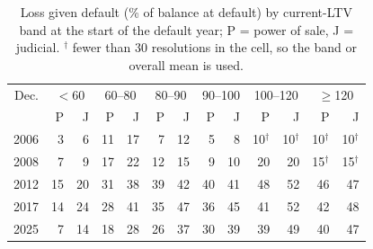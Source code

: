 \begin{table}[H]\centering\footnotesize
\caption{Loss given default (\% of balance at default) by current-LTV band at the start of the default year; P = power of sale, J = judicial. $^\dagger$ fewer than 30 resolutions in the cell, so the band or overall mean is used.}\label{tab:lgd}
\setlength{\tabcolsep}{3.5pt}
\begin{tabular}{rrrrrrrrrrrrr}\toprule
Dec. & \multicolumn{2}{c}{$<$60} & \multicolumn{2}{c}{60--80} & \multicolumn{2}{c}{80--90} & \multicolumn{2}{c}{90--100} & \multicolumn{2}{c}{100--120} & \multicolumn{2}{c}{$\ge$120} \\
 & P & J & P & J & P & J & P & J & P & J & P & J \\ \midrule
2006 & 3 & 6 & 11 & 17 & 7 & 12 & 5 & 8 & 10$^\dagger$ & 10$^\dagger$ & 10$^\dagger$ & 10$^\dagger$ \\
2008 & 7 & 9 & 17 & 22 & 12 & 15 & 9 & 10 & 20 & 20 & 15$^\dagger$ & 15$^\dagger$ \\
2012 & 15 & 20 & 31 & 38 & 39 & 42 & 40 & 41 & 48 & 52 & 46 & 47 \\
2017 & 14 & 24 & 28 & 41 & 35 & 47 & 36 & 45 & 41 & 52 & 42 & 48 \\
2025 & 7 & 14 & 18 & 28 & 26 & 37 & 30 & 39 & 39 & 49 & 40 & 47 \\
\bottomrule\end{tabular}
\end{table}
